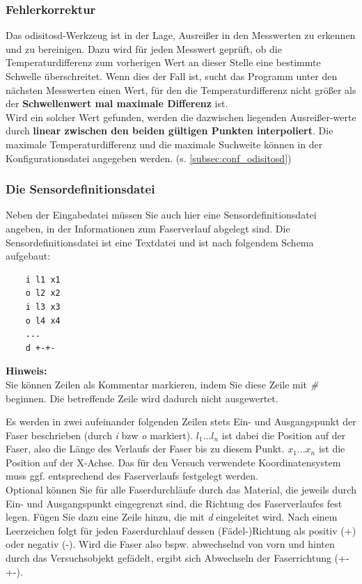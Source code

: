 \documentclass[10pt,a5paper,twoside,titlepage]{scrartcl}
\newenvironment{myshaded}
  {\def\FrameCommand{\colorbox{shadecolor}}
    \MakeFramed {\advance\hsize-\width \FrameRestore}}
 {\endMakeFramed}
\newenvironment{hinweis}
  {\colorlet{shadecolor}{black!20}%
      \begin{myshaded}
      \begin{minipage}{\linewidth}
	  \hangindent 20pt  
      \textbf{Hinweis:}\\
      }
  {\end{minipage}\end{myshaded}}
\begin{document}
	\subsubsection{Fehlerkorrektur}
	Das odisitosd-Werkzeug ist in der Lage, Ausreißer in den Messwerten zu erkennen und zu bereinigen.
	Dazu wird für jeden Messwert geprüft, ob die Temperaturdifferenz zum vorherigen Wert an dieser Stelle eine bestimmte Schwelle überschreitet. Wenn dies der Fall ist, sucht das Programm unter den nächsten Messwerten einen Wert, für den die Temperaturdifferenz nicht größer als der \textbf{Schwellenwert mal maximale Differenz} ist.\\
	Wird ein solcher Wert gefunden, werden die dazwischen liegenden Ausreißer-werte durch \textbf{linear zwischen den beiden gültigen Punkten interpoliert}.
	Die maximale Temperaturdifferenz und die maximale Suchweite können in der Konfigurationsdatei angegeben werden. (s. \ref{subsec:conf_odisitosd})
	\subsubsection{Die Sensordefinitionsdatei}
	\label{subsec:sdef_odisitosd}
	Neben der Eingabedatei müssen Sie auch hier eine Sensordefinitionsdatei angeben, in der Informationen zum Faserverlauf abgelegt sind. Die Sensordefinitionsdatei ist eine Textdatei und ist nach folgendem Schema aufgebaut:\\
	\begin{lstlisting}
	i l1 x1
	o l2 x2
	i l3 x3
	o l4 x4
	...
	d +-+-
	\end{lstlisting}
	\begin{hinweis}
	Sie können Zeilen als Kommentar markieren, indem Sie diese Zeile mit \emph{\#} beginnen. Die betreffende Zeile wird dadurch nicht ausgewertet.
	\end{hinweis}
	Es werden in zwei aufeinander folgenden Zeilen stets Ein- und Ausgangspunkt der Faser beschrieben (durch \emph{i} bzw \emph{o} markiert). $l_1...l_n$ ist dabei die Position auf der Faser, also die Länge des Verlaufs der Faser bis zu diesem Punkt. $x_1...x_n$ ist die Position auf der X-Achse. Das für den Versuch verwendete Koordinatensystem muss ggf. entsprechend des Faserverlaufs festgelegt werden.	\\
	Optional können Sie für alle Faserdurchläufe durch das Material, die jeweils durch Ein- und Ausgangspunkt eingegrenzt sind, die Richtung des Faserverlaufes fest legen. Fügen Sie dazu eine Zeile hinzu, die mit \emph{d} eingeleitet wird. Nach einem Leerzeichen folgt für jeden Faserdurchlauf dessen (Fädel-)Richtung als positiv (+) oder negativ (-). Wird die Faser also bspw. abwechselnd von vorn und  hinten durch das Versuchsobjekt gefädelt, ergibt sich Abwechseln der Faserrichtung (+-+-).
\end{document}

